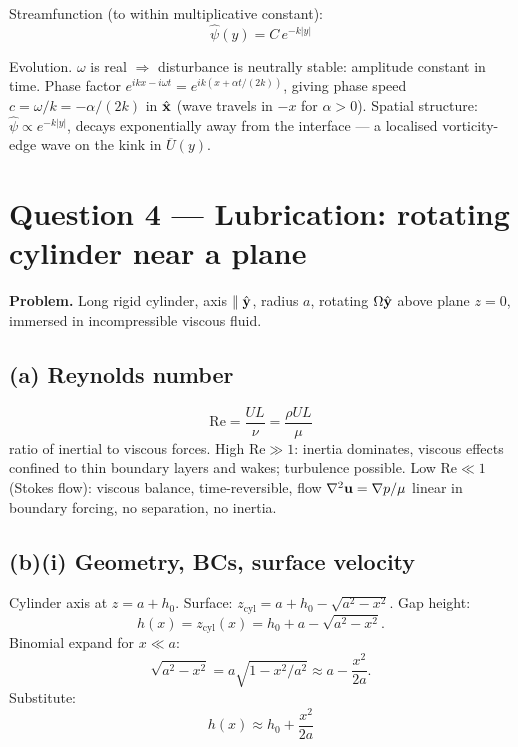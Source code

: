 \documentclass[11pt]{article}
\newcommand{\Lap}{\nabla^{2}}
\begin{document}
Streamfunction (to within multiplicative constant):
\[
\boxed{\;\hat\psi(y)=C\,e^{-k|y|}\;}
\]

Evolution. $\omega$ is real $\Rightarrow$ disturbance is neutrally stable: amplitude constant in time. Phase factor $e^{ikx-i\omega t}=e^{ik(x+\alpha t/(2k))}$, giving phase speed $c=\omega/k=-\alpha/(2k)$ in $\hat{\vb x}$ (wave travels in $-x$ for $\alpha>0$). Spatial structure: $\hat\psi\propto e^{-k|y|}$, decays exponentially away from the interface --- a localised vorticity-edge wave on the kink in $\overline U(y)$.

\section*{Question 4 --- Lubrication: rotating cylinder near a plane}

\textbf{Problem.} Long rigid cylinder, axis $\parallel\hat{\vb y}$, radius $a$, rotating $\Omega\hat{\vb y}$ above plane $z=0$, immersed in incompressible viscous fluid.

\subsection*{(a) Reynolds number}

\[
\boxed{\;\mathrm{Re}=\frac{UL}{\nu}=\frac{\rho UL}{\mu}\;}
\]
ratio of inertial to viscous forces. High $\mathrm{Re}\gg 1$: inertia dominates, viscous effects confined to thin boundary layers and wakes; turbulence possible. Low $\mathrm{Re}\ll 1$ (Stokes flow): viscous balance, time-reversible, flow $\Lap\vb u=\nabla p/\mu$ linear in boundary forcing, no separation, no inertia.

\subsection*{(b)(i) Geometry, BCs, surface velocity}

Cylinder axis at $z=a+h_0$. Surface: $z_{\text{cyl}}=a+h_0-\sqrt{a^2-x^2}$. Gap height:
\[
h(x)=z_{\text{cyl}}(x)=h_0+a-\sqrt{a^2-x^2}.
\]
Binomial expand for $x\ll a$:
\[
\sqrt{a^2-x^2}=a\sqrt{1-x^2/a^2}\approx a-\frac{x^2}{2a}.
\]
Substitute:
\begin{equation}
\boxed{\;h(x)\approx h_0+\frac{x^2}{2a}\;}
\label{eq:h-paraboloid}
\end{equation}
\end{document}
